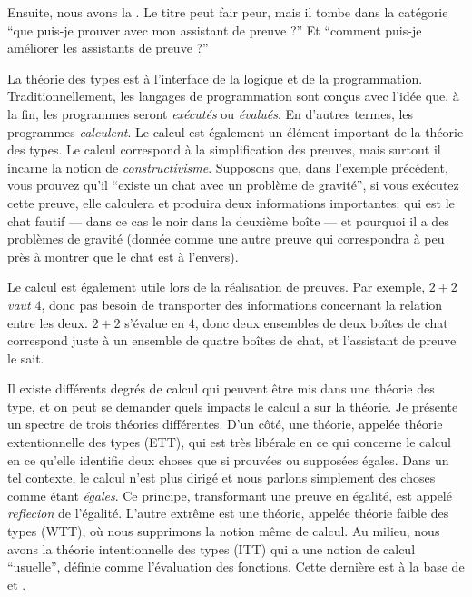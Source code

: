 Ensuite, nous avons la .
Le titre peut fair peur, mais il tombe dans la catégorie ``que puis-je prouver
avec mon assistant de preuve ?'' Et ``comment puis-je améliorer les assistants
de preuve ?''

La théorie des types est à l'interface de la logique et de la programmation.
Traditionnellement, les langages de programmation sont conçus avec l'idée que,
à la fin, les programmes seront \emph{exécutés} ou \emph{évalués}. En d'autres
termes, les programmes \emph{calculent}.
Le calcul est également un élément important de la théorie des types. Le calcul
correspond à la simplification des preuves, mais surtout il incarne la notion de
\emph{constructivisme}. Supposons que, dans l'exemple précédent, vous prouvez
qu'il ``existe un chat avec un problème de gravité'', si vous exécutez cette
preuve, elle calculera et produira deux informations importantes: qui est le
chat fautif --- dans ce cas le noir dans la deuxième boîte --- et pourquoi il a
des problèmes de gravité (donnée comme une autre preuve qui correspondra à peu
près à montrer que le chat est à l'envers).

Le calcul est également utile lors de la réalisation de preuves.
Par exemple, \(2 + 2\) \emph{vaut} \(4\), donc pas besoin de transporter des
informations concernant la relation entre les deux. \(2 + 2\) s'évalue en \(4\),
donc deux ensembles de deux boîtes de chat correspond juste à un ensemble de
quatre boîtes de chat, et l'assistant de preuve le sait.

Il existe différents degrés de calcul qui peuvent être mis dans une théorie des
type, et on peut se demander quels impacts le calcul a sur la théorie.
Je présente un spectre de trois théories différentes. D'un côté, une théorie,
appelée théorie extentionnelle des types (ETT), qui est très libérale en ce qui
concerne le calcul en ce qu'elle identifie deux choses que si prouvées ou
supposées égales. Dans un tel contexte, le calcul n'est plus dirigé et nous
parlons simplement des choses comme étant \emph{égales}.
Ce principe, transformant une preuve en égalité, est appelé \emph{reflecion} de
l'égalité.
L'autre extrême est une théorie, appelée théorie faible des types (WTT), où nous
supprimons la notion même de calcul. Au milieu, nous avons la théorie
intentionnelle des types (ITT) qui a une notion de calcul ``usuelle'', définie
comme l'évaluation des fonctions. Cette dernière est à la base de \Coq et \Agda.

